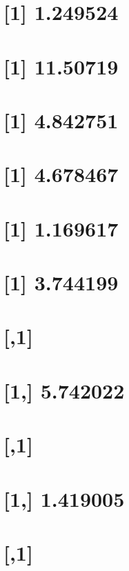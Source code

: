 \documentclass[]{book}
\theoremstyle{definition}
\theoremstyle{definition}
\theoremstyle{definition}
\theoremstyle{remark}
\begin{document}
\section{{[}1{]} 1.249524}\label{section-34}

\section{{[}1{]} 11.50719}\label{section-35}

\section{{[}1{]} 4.842751}\label{section-36}

\section{{[}1{]} 4.678467}\label{section-37}

\section{{[}1{]} 1.169617}\label{section-38}

\section{{[}1{]} 3.744199}\label{section-39}

\section{{[},1{]}}\label{section-40}

\section{{[}1,{]} 5.742022}\label{section-41}

\section{{[},1{]}}\label{section-42}

\section{{[}1,{]} 1.419005}\label{section-43}

\section{{[},1{]}}\label{section-44}
\end{document}
